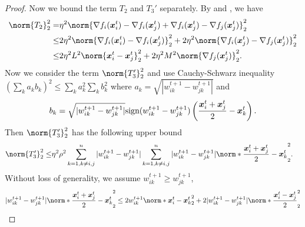 \documentclass{article}
\begin{document}
\begin{proof}
  Now we bound the term $T_2$ and $T_3'$ separately. By  and , we have
  \begin{equation}\label{eq:consensus-distance:T2}
    \begin{split}
    \norm{T_2}_2^2 =& \eta^2 \norm{\nabla f_i(\xx_i^t) - \nabla f_i(\xx_j^t) + \nabla f_i(\xx_j^t) - \nabla f_j(\xx_j^t)}_2^2  \\
    \le& 2 \eta^2 \norm{\nabla f_i(\xx_i^t) - \nabla f_i(\xx_j^t)}_2^2 + 2 \eta^2 \norm{\nabla f_i(\xx_j^t) - \nabla f_j(\xx_j^t)}_2^2 \\
    \le& 2 \eta^2 L^2 \norm{\xx_i^t - \xx_j^t}_2^2 + 2 \eta^2 M^2 \norm{\nabla f_j(\xx_j^t)}_2^2.
  \end{split}
\end{equation}
  Now we consider the term $\norm{T_3'}_2^2$ and use Cauchy-Schwarz inequality $(\sum_k a_k b_k)^2\le \sum_k a_k^2 \sum_k b_k^2$ where $a_k=\sqrt{|w_{ik}^{t+1}-w_{jk}^{t+1}|}$ and
  \begin{align*}
    b_k=
    \sqrt{|w_{ik}^{t+1}-w_{jk}^{t+1}|} \text{sign}(w_{ik}^{t+1}-w_{jk}^{t+1}) \left( \frac{\bm{x}_i^t+\bm{x}_j^t}{2} -
    \bm{x}_k^t \right).
  \end{align*}
  Then $\norm{T_3'}_2^2$ has the following upper bound
  \begin{align*}
    \norm{T_3'}_2^2
    \le& \eta^2 \rho^2 \sum_{k=1,k\neq i,j}^n |w_{ik}^{t+1}-w_{jk}^{t+1}| \sum_{k=1,k\neq i,j}^n |w_{ik}^{t+1}-w_{jk}^{t+1}| \norm*{ \frac{\xx_i^t+\xx_j^t}{2}  - \xx_k^t }_2^2.
  \end{align*}
  Without loss of generality, we assume $w_{ik}^{t+1} \ge w_{jk}^{t+1}$, 
  \begin{align*}
    |w_{ik}^{t+1}-w_{jk}^{t+1}| \norm*{ \frac{\xx_i^t+\xx_j^t}{2}  - \xx_k^t }_2^2
    \le 2 w_{ik}^{t+1} \norm*{ \xx_i^t - \xx_k^t }_2^2
    + 2|w_{ik}^{t+1}-w_{jk}^{t+1}| \norm*{ \frac{\xx_i^t-\xx_j^t}{2}}_2^2
  \end{align*}


\end{proof}
\end{document}
